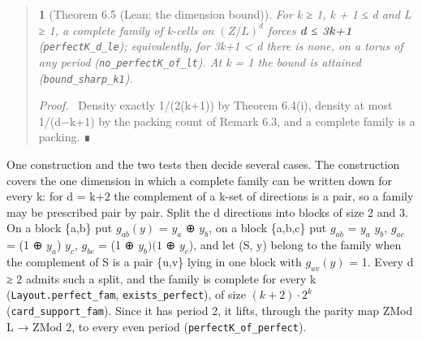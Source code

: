 \documentclass[11pt,a4paper]{article}
\theoremstyle{named}
\newtheorem*{namedthm}{}
\newenvironment{mdproof}[1][Proof]{\par\medskip\noindent\textit{#1.}\ }{\par\medskip}
\begin{document}
\begin{quote}
\begin{namedthm}[Theorem 6.5 (Lean; the dimension bound)]
For k ≥ 1, k + 1 ≤ d and L ≥ 1, a complete family of k-cells on $(Z/L)^d$ forces \textbf{d ≤ 3k+1} (\texttt{perfectK\_\allowbreak{}d\_\allowbreak{}le}); equivalently, for 3k+1 \textless{} d there is none, on a torus of any period (\texttt{no\_\allowbreak{}perfectK\_\allowbreak{}of\_\allowbreak{}lt}). At k = 1 the bound is attained (\texttt{bound\_\allowbreak{}sharp\_\allowbreak{}k1}).
\end{namedthm}
\begin{mdproof}[Proof]
Density exactly 1/(2(k+1)) by Theorem 6.4(i), density at most 1/(d−k+1) by the packing count of Remark 6.3, and a complete family is a packing. ∎
\end{mdproof}
\end{quote}
One construction and the two tests then decide several cases. The construction covers the one dimension in which a complete family can be written down for every k: for d = k+2 the complement of a k-set of directions is a pair, so a family may be prescribed pair by pair. Split the d directions into blocks of size 2 and 3. On a block \{a,b\} put $g_{ab}(y)$ = $y_a$ ⊕ $y_b$, on a block \{a,b,c\} put $g_{ab}$ = $y_a$ $y_b$, $g_{ac}$ = (1 ⊕ $y_a$) $y_c$, $g_{bc}$ = (1 ⊕ $y_b)(1$ ⊕ $y_c$), and let (S, y) belong to the family when the complement of S is a pair \{u,v\} lying in one block with $g_{uv}(y)$ = 1. Every d ≥ 2 admits such a split, and the family is complete for every k (\texttt{Layout.\allowbreak{}perfect\_\allowbreak{}fam}, \texttt{exists\_\allowbreak{}perfect}), of size $(k+2)·2^k$ (\texttt{card\_\allowbreak{}support\_\allowbreak{}fam}). Since it has period 2, it lifts, through the parity map ZMod L → ZMod 2, to every even period (\texttt{perfectK\_\allowbreak{}of\_\allowbreak{}perfect}).
\end{document}
